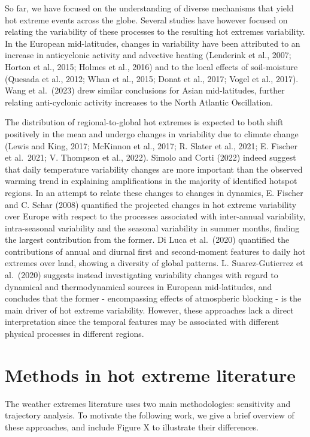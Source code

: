\documentclass[11pt,a4paper,twoside,openright]{report}
\theoremstyle{definition}
\begin{document}
So far, we have focused on the understanding of diverse mechanisms that yield hot extreme events across the globe. Several studies have however focused on relating the variability of these processes to the resulting hot extremes variability. In the European mid-latitudes, changes in variability have been attributed to an increase in anticyclonic activity and advective heating (Lenderink et al., 2007; Horton et al., 2015; Holmes et al., 2016) and to the local effects of soil-moisture (Quesada et al., 2012; Whan et al., 2015; Donat et al., 2017; Vogel et al., 2017). Wang et al.~(2023) drew similar conclusions for Asian mid-latitudes, further relating anti-cyclonic activity increases to the North Atlantic Oscillation.

The distribution of regional-to-global hot extremes is expected to both shift positively in the mean and undergo changes in variability due to climate change (Lewis and King, 2017; McKinnon et al., 2017; R. Slater et al., 2021; E. Fischer et al.~2021; V. Thompson et al., 2022). Simolo and Corti (2022) indeed suggest that daily temperature variability changes are more important than the observed warming trend in explaining amplifications in the majority of identified hotspot regions. In an attempt to relate these changes to changes in dynamics, E. Fischer and C. Schar (2008) quantified the projected changes in hot extreme variability over Europe with respect to the processes associated with inter-annual variability, intra-seasonal variability and the seasonal variability in summer months, finding the largest contribution from the former. Di Luca et al.~(2020) quantified the contributions of annual and diurnal first and second-moment features to daily hot extremes over land, showing a diversity of global patterns. L. Suarez-Gutierrez et al.~(2020) suggests instead investigating variability changes with regard to dynamical and thermodynamical sources in European mid-latitudes, and concludes that the former - encompassing effects of atmospheric blocking - is the main driver of hot extreme variability. However, these approaches lack a direct interpretation since the temporal features may be associated with different physical processes in different regions.

\section{Methods in hot extreme literature}\label{methods-in-hot-extreme-literature}

The weather extremes literature uses two main methodologies: sensitivity and trajectory analysis. To motivate the following work, we give a brief overview of these approaches, and include Figure X to illustrate their differences.
\end{document}
